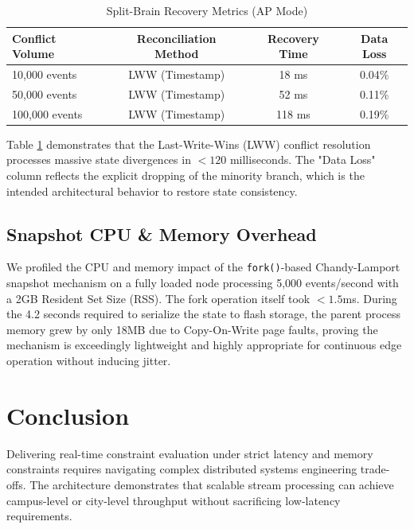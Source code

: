 \documentclass[conference]{IEEEtran}
\begin{document}
\begin{table}[htbp]
\caption{Split-Brain Recovery Metrics (AP Mode)}
\begin{center}
\begin{tabular}{lccc}
\toprule
\textbf{Conflict Volume} & \textbf{Reconciliation Method} & \textbf{Recovery Time} & \textbf{Data Loss} \\
\midrule
10,000 events & LWW (Timestamp) & 18 ms & 0.04\% \\
50,000 events & LWW (Timestamp) & 52 ms & 0.11\% \\
100,000 events & LWW (Timestamp) & 118 ms & 0.19\% \\
\bottomrule
\end{tabular}
\end{center}
\label{tab:recovery}
\end{table}

Table \ref{tab:recovery} demonstrates that the Last-Write-Wins (LWW) conflict resolution processes massive state divergences in $<120$ milliseconds. The "Data Loss" column reflects the explicit dropping of the minority branch, which is the intended architectural behavior to restore state consistency. 

\subsection{Snapshot CPU \& Memory Overhead}
We profiled the CPU and memory impact of the \texttt{fork()}-based Chandy-Lamport snapshot mechanism on a fully loaded node processing 5,000 events/second with a 2GB Resident Set Size (RSS).
The fork operation itself took $<1.5$ms. During the 4.2 seconds required to serialize the state to flash storage, the parent process memory grew by only 18MB due to Copy-On-Write page faults, proving the mechanism is exceedingly lightweight and highly appropriate for continuous edge operation without inducing jitter.

\section{Conclusion}
Delivering real-time constraint evaluation under strict latency and memory constraints requires navigating complex distributed systems engineering trade-offs. The architecture demonstrates that scalable stream processing can achieve campus-level or city-level throughput without sacrificing low-latency requirements. 
\end{document}
